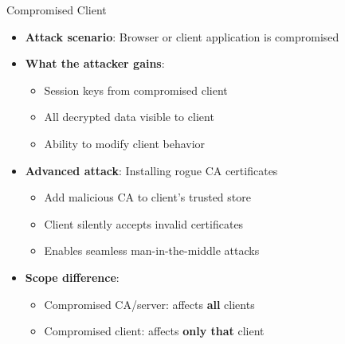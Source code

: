 \documentclass[aspectratio=169, lualatex, handout]{beamer}
\begin{document}
\begin{frame}{Compromised Client}
	\begin{itemize}
		\item \textbf{Attack scenario}: Browser or client application is compromised
		\item \textbf{What the attacker gains}:
		      \begin{itemize}
			      \item Session keys from compromised client
			      \item All decrypted data visible to client
			      \item Ability to modify client behavior
		      \end{itemize}
		\item \textbf{Advanced attack}: Installing rogue CA certificates
		      \begin{itemize}
			      \item Add malicious CA to client's trusted store
			      \item Client silently accepts invalid certificates
			      \item Enables seamless man-in-the-middle attacks
		      \end{itemize}
		\item \textbf{Scope difference}:
		      \begin{itemize}
			      \item Compromised CA/server: affects \textbf{all} clients
			      \item Compromised client: affects \textbf{only that} client
		      \end{itemize}
	\end{itemize}
\end{frame}
\end{document}
